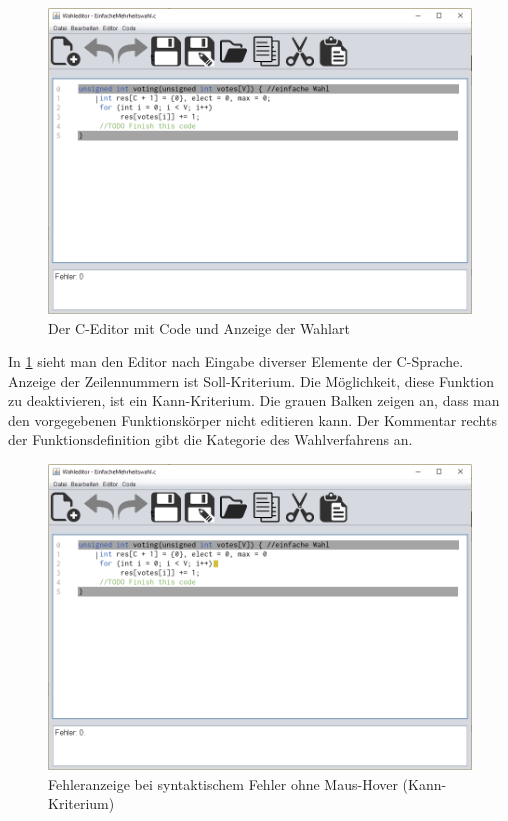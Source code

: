\documentclass[a4paper]{scrreprt}
\begin{document}
\begin{figure}[H]
\includegraphics[scale=0.4]{Editor-mit-text.png}
\caption{Der C-Editor mit Code und Anzeige der Wahlart}
\label{Editor-mit-text}
\end{figure}

In \ref{Editor-mit-text} sieht man den Editor nach Eingabe diverser Elemente der C-Sprache. Anzeige der Zeilennummern ist Soll-Kriterium. Die Möglichkeit, diese Funktion zu deaktivieren, ist ein Kann-Kriterium. Die grauen Balken zeigen an, dass man den vorgegebenen Funktionskörper nicht editieren kann. Der Kommentar rechts der Funktionsdefinition gibt die Kategorie des Wahlverfahrens an.

\begin{figure}[H]
\includegraphics[scale=0.4]{Editor-mit-Fehler-ohne-hover.png}
\caption{Fehleranzeige bei syntaktischem Fehler ohne Maus-Hover (Kann-Kriterium)}
\label{Editor-mit-Fehler-ohne-hover}
\end{figure}
\end{document}
